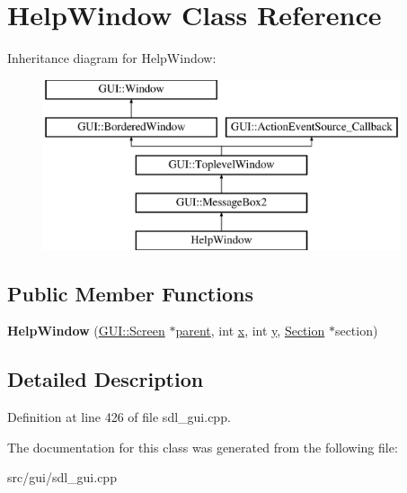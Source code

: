 \hypertarget{classHelpWindow}{\section{Help\-Window Class Reference}
\label{classHelpWindow}
}
Inheritance diagram for Help\-Window\-:\begin{figure}[H]
\begin{center}
\leavevmode
\includegraphics[height=5.000000cm]{classHelpWindow}
\end{center}
\end{figure}
\subsection*{Public Member Functions}
\begin{DoxyCompactItemize}
\item 
\hypertarget{classHelpWindow_a187ef189ba63c6c5ecf56aea58890d91}{{\bfseries Help\-Window} (\hyperlink{classGUI_1_1Screen}{G\-U\-I\-::\-Screen} $\ast$\hyperlink{classGUI_1_1Window_a2e593ff65e7702178d82fe9010a0b539}{parent}, int \hyperlink{classGUI_1_1Window_a6ca6a80ca00c9e1d8ceea8d3d99a657d}{x}, int \hyperlink{classGUI_1_1Window_a0ee8e923aff2c3661fc2e17656d37adf}{y}, \hyperlink{classSection}{Section} $\ast$section)}\label{classHelpWindow_a187ef189ba63c6c5ecf56aea58890d91}

\end{DoxyCompactItemize}


\subsection{Detailed Description}


Definition at line 426 of file sdl\-\_\-gui.\-cpp.



The documentation for this class was generated from the following file\-:\begin{DoxyCompactItemize}
\item 
src/gui/sdl\-\_\-gui.\-cpp\end{DoxyCompactItemize}
